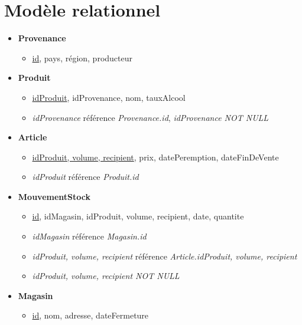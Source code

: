 \documentclass[12pt]{report}
\begin{document}
    \section*{Modèle relationnel}

    \begin{itemize}
        \item \textbf{Provenance}
        \begin{itemize}
            \item \underline{id}, pays, région, producteur
        \end{itemize}

        \item \textbf{Produit}
        \begin{itemize}
            \item \underline{idProduit}, idProvenance, nom, tauxAlcool
            \item \textit{idProvenance} référence \textit{Provenance.id}, \textit{idProvenance NOT NULL}
        \end{itemize}

        \item \textbf{Article}
        \begin{itemize}
            \item \underline{idProduit, volume, recipient}, prix, datePeremption, dateFinDeVente
            \item \textit{idProduit} référence \textit{Produit.id}
        \end{itemize}

        \item \textbf{MouvementStock}
        \begin{itemize}
            \item \underline{id}, idMagasin, idProduit, volume, recipient, date, quantite
            \item \textit{idMagasin} référence \textit{Magasin.id}
            \item \textit{idProduit, volume, recipient} référence \textit{Article.idProduit, volume, recipient}
            \item \textit{idProduit, volume, recipient NOT NULL}
        \end{itemize}

        \item \textbf{Magasin}
        \begin{itemize}
            \item \underline{id}, nom, adresse, dateFermeture
        \end{itemize}


\end{itemize}
\end{document}
